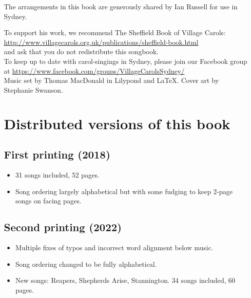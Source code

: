 \documentclass[a4paper,twoside]{article}
\date{\vspace{-12ex}}
\newcommand*{\offset}{5mm}
\begin{document}
%

\clearpage

\thispagestyle{empty}
    \null{}
        \begin{center}        
The arrangements in this book are generously shared by Ian Russell for use in Sydney. 

To support his work, we recommend The Sheffield Book of Village Carols: \url{http://www.villagecarols.org.uk/publications/sheffield-book.html}\\
and ask that you do not redistribute this songbook.\\


To keep up to date with carol-singings in Sydney, please join our Facebook group at \url{https://www.facebook.com/groups/VillageCarolsSydney/}\\

Music set by Thomas MacDonald in Lilypond and LaTeX. Cover art by Stephanie Swanson.
       \end{center}
\null

\section*{Distributed versions of this book}
\subsection*{First printing (2018)}
\begin{itemize}
    \item 31 songs included, 52 pages.
    \item Song ordering largely alphabetical but with some fudging to keep 2-page songs on facing pages.
\end{itemize}
\subsection*{Second printing (2022)}
\begin{itemize}
    \item Multiple fixes of typos and incorrect word alignment below music.
    \item Song ordering changed to be fully alphabetical. 
    \item New songs: Reapers, Shepherds Arise, Stannington. 34 songs included, 60 pages.
\end{itemize} 
\clearpage
\end{document}
